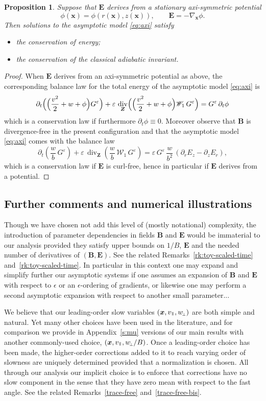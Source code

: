 \documentclass[JEP,XML,SOM,Unicode]{cedram}
\let\mathcal\mathscr
\newcommand{\sperp}{{\scriptscriptstyle\perp}}
\let\eps\varepsilon
\let\d\partial
\DeclareMathOperator{\Div}{div}
\theoremstyle{plain}
\newtheorem{proposition}[theorem]{Proposition}
\theoremstyle{definition}
\newcommand{\bpr}{\begin{proposition}}
\newcommand{\epr}{\end{proposition}}
\newcommand\bB{{\boldsymbol B}}
\newcommand\bE{{\boldsymbol E}}
\newcommand\bfx{{\boldsymbol x}}
\newcommand\bfZ{{\boldsymbol Z}}
\newcommand\cW{{\mathcal W}}
\newcommand\vpar{v_\mypar}
\newcommand\eperp{w_{\!\sperp}}
\let\e w
\newcommand\Er{E_r}
\newcommand\Ez{E_z}
\newcommand{\mypar}{{\mkern3mu\vphantom{\perp}\vrule depth 0pt\mkern2mu\vrule depth 0pt\mkern3mu}}
\begin{document}
\bpr
\label{prop:cons3}
Suppose that $\bE$ derives from a stationary axi-symmetric potential
\[
\phi(\bfx)=\phi(r(\bfx),z(\bfx)),\qquad
\bE=-\nabla_\bfx\phi.
\]
Then solutions to the asymptotic model \eqref{eq:axi} satisfy
\begin{itemize}
\item the conservation of energy;
\item the conservation of the classical adiabatic invariant.
\end{itemize}
\epr
\begin{proof}
When $\bE$ derives from an axi-symmetric potential as above, the corresponding balance law for the total energy of the asymptotic model \eqref{eq:axi} is
\[
\d_t \Bigl(\Bigl(\frac{v^2}{2}+\e+\phi\Bigr)G^\eps\Bigr)+\eps\,\Div_{\bfZ} \Bigl(\Bigl(\frac{v^2}{2}+\e+\phi\Bigr)\cW_1\,G^\eps\Bigr)
=G^\eps\,\d_t\phi
\]
which is a conservation law if furthermore $\d_t\phi\equiv0$. Moreover observe that $\bB$ is divergence-free in the present configuration and that the asymptotic model \eqref{eq:axi} comes with the balance law
\[
\d_t \left(\frac{\e}{b}\,G^\eps\right)+\eps\,\Div_{\bfZ} \left(\frac{\e}{b}\,\cW_1\,G^\eps\right)
=\eps\,G^\eps\,\frac{\e}{b^2}\,(\d_r\Ez-\d_z\Er),
\]
which is a conservation law if $\bE$ is curl-free, hence in particular if $\bE$ derives from a potential.
\end{proof}

\subsection{Further comments and numerical illustrations}

Though we have chosen not add this level of (mostly notational) complexity, the introduction of parameter dependencies in fields $\bB$ and $\bE$ would be immaterial to our analysis provided they satisfy upper bounds on $1/B$, $\bE$ and the needed number of derivatives of $(\bB,\bE)$. See the related Remarks~\ref{rk:toy-scaled-time} and~\ref{rk:toy-scaled-time}. In particular in this context one may expand and simplify further our asymptotic systems if one assumes an expansion of $\bB$ and $\bE$ with respect to $\epsilon$ or an $\epsilon$-ordering of gradients, or likewise one may perform a second asymptotic expansion with respect to another small parameter...

We believe that our leading-order slow variables $(\bfx,\vpar,\eperp)$ are both simple and natural. Yet many other choices have been used in the literature, and for comparison we provide in Appendix~\ref{s:mu} versions of our main results with another commonly-used choice, $(\bfx,\vpar,\eperp/B)$. Once a leading-order choice has been made, the higher-order corrections added to it to reach varying order of slowness are uniquely determined provided that a normalization is chosen. All through our analysis our implicit choice is to enforce that corrections have no slow component in the sense that they have zero mean with respect to the fast angle. See the related Remarks~\ref{trace-free} and~\ref{trace-free-bis}.
\end{document}
